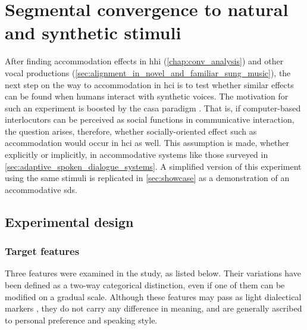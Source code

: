 \section{Segmental convergence to natural and synthetic stimuli}
\label{sec:convergence_to_natural_and_synthetic_stimuli}

After finding accommodation effects in \ac{hhi} (\cref{chap:conv_analysis}) and other vocal productions (\cref{sec:alignment_in_novel_and_familiar_sung_music}), the next step on the way to accommodation in \ac{hci} is to test whether similar effects can be found when humans interact with synthetic voices.
The motivation for such an experiment is boosted by the \ac{casa} paradigm \citep[][and cf.\ \cref{subsec:verbal_interaction}]{Nass1994computers, Nass2000machines}.
That is, if computer-based interlocutors can be perceived as social functions in communicative interaction, the question arises, therefore, whether socially-oriented effect such as accommodation would occur in \ac{hci} as well.
This assumption is made, whether explicitly or implicitly, in accommodative systems like those surveyed in \cref{sec:adaptive_spoken_dialogue_systems}.
A simplified version of this experiment using the same stimuli is replicated in \cref{sec:showcase} as a demonstration of an accommodative \ac{sds}.

\subsection{Experimental design}
\label{subsec:design_HCIConv}

\subsubsection{Target features}
\label{subsubsec:target_features_HCIConv}

Three features were examined in the study, as listed below.
Their variations have been defined as a two-way categorical distinction, even if one of them can be modified on a gradual scale.
Although these features may pass as light dialectical markers \citep{Mitterer2013regional}, they do not carry any difference in meaning, and are generally ascribed to personal preference and speaking style.

